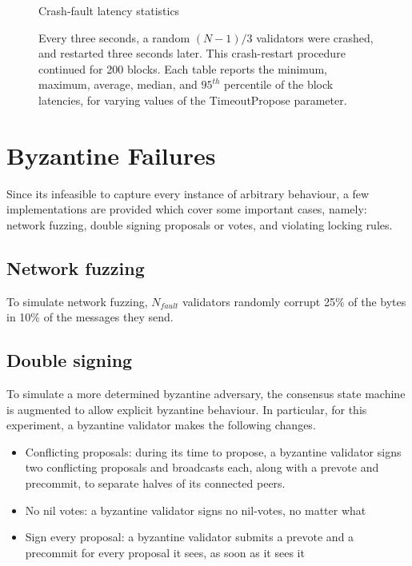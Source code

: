 \begin{figure}[]
	Crash-fault latency statistics	
	
	\label{fig:exp:crash_failure}
	\caption[Latency statistics under crash faults]{Every three seconds, a random $(N-1)/3$ validators were crashed, and restarted three seconds later. This crash-restart procedure continued for 200 blocks. Each table reports the minimum, maximum, average, median, and $95^{th}$ percentile of the block latencies, for varying values of the TimeoutPropose parameter.}
\end{figure}


\section{Byzantine Failures}

Since its infeasible to capture every instance of arbitrary behaviour,
a few implementations are provided which cover some important cases, namely:
network fuzzing, double signing proposals or votes, and violating locking rules.

\subsection{Network fuzzing}

To simulate network fuzzing, $N_{fault}$ validators randomly corrupt 25\% of the bytes in 10\% of the messages they send.

\subsection{Double signing}

To simulate a more determined byzantine adversary, the consensus state machine is augmented to allow explicit byzantine behaviour.
In particular, for this experiment, a byzantine validator makes the following changes.

\begin{itemize}
\item{Conflicting proposals: during its time to propose, a byzantine validator signs two conflicting proposals and broadcasts each, along with a prevote and precommit, to separate halves of its connected peers.} 
\item{No nil votes: a byzantine validator signs no nil-votes, no matter what}
\item{Sign every proposal: a byzantine validator submits a prevote and a precommit for every proposal it sees, as soon as it sees it}
\end{itemize}

